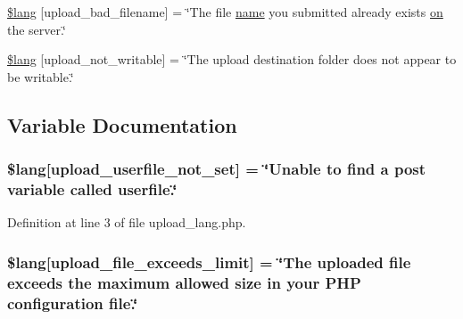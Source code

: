 \begin{DoxyCompactItemize}
\item 
\hyperlink{system_2language_2english_2upload__lang_8php_abb379322384f3f35952a539c63e2c8f7}{\$lang} \mbox{[}\textquotesingle{}upload\+\_\+bad\+\_\+filename\textquotesingle{}\mbox{]} = \char`\"{}The file \hyperlink{user_8php_a765af5e9671743530143a6d3670fd9a6}{name} you submitted already exists \hyperlink{fullpage_2plugin_8min_8js_a0258429d15d28b8440a6c44b3a15f390}{on} the server.\char`\"{}
\item 
\hyperlink{system_2language_2english_2upload__lang_8php_aed6bfb5a9094179427f61fcbb582145b}{\$lang} \mbox{[}\textquotesingle{}upload\+\_\+not\+\_\+writable\textquotesingle{}\mbox{]} = \char`\"{}The upload destination folder does not appear to be writable.\char`\"{}
\end{DoxyCompactItemize}


\subsection{Variable Documentation}
\subsubsection[{\texorpdfstring{\$lang}{$lang}}]{\setlength{\rightskip}{0pt plus 5cm}\$lang\mbox{[}\textquotesingle{}upload\+\_\+userfile\+\_\+not\+\_\+set\textquotesingle{}\mbox{]} = \char`\"{}Unable to find {\bf a} post variable called userfile.\char`\"{}}\hypertarget{system_2language_2english_2upload__lang_8php_a6d12ff4074b1e4c6f22a4a5107fae5ee}{}\label{system_2language_2english_2upload__lang_8php_a6d12ff4074b1e4c6f22a4a5107fae5ee}


Definition at line 3 of file upload\+\_\+lang.\+php.

\subsubsection[{\texorpdfstring{\$lang}{$lang}}]{\setlength{\rightskip}{0pt plus 5cm}\$lang\mbox{[}\textquotesingle{}upload\+\_\+file\+\_\+exceeds\+\_\+limit\textquotesingle{}\mbox{]} = \char`\"{}The uploaded file exceeds the maximum allowed size in your P\+HP configuration file.\char`\"{}}\hypertarget{system_2language_2english_2upload__lang_8php_a9028f049ebbe292a27e0e2b2e5f7d660}{}\label{system_2language_2english_2upload__lang_8php_a9028f049ebbe292a27e0e2b2e5f7d660}


